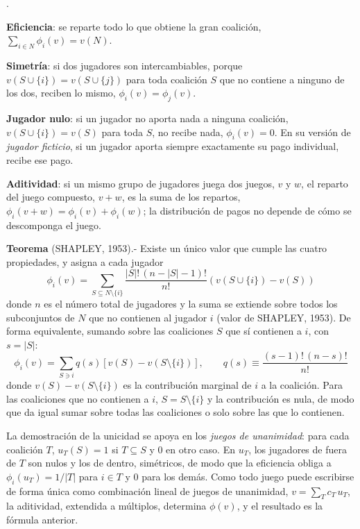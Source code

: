 \documentclass[10pt,a4paper]{article}
\newcounter{numitem}
\newenvironment{lnum}
      {\begin{list}{\arabic{numitem}.}{%
          \usecounter{numitem}%
          \setlength{\leftmargin}{1cm}%
          \setlength{\parskip}{3pt}%
          \setlength{\itemsep}{0pt}%
          \setlength{\parsep}{0pt}%
      }}
      {\end{list}}
\begin{document}
\begin{lnum}
    \item \textbf{Eficiencia}: se reparte todo lo que obtiene la gran coalición, $\sum_{i\in N}\phi_i(v)=v(N)$.
    \item \textbf{Simetría}: si dos jugadores son intercambiables, porque $v(S\cup\{i\})=v(S\cup\{j\})$ para toda coalición $S$ que no contiene a ninguno de los dos, reciben lo mismo, $\phi_i(v)=\phi_j(v)$.
    \item \textbf{Jugador nulo}: si un jugador no aporta nada a ninguna coalición, $v(S\cup\{i\})=v(S)$ para toda $S$, no recibe nada, $\phi_i(v)=0$. En su versión de \textit{jugador ficticio}, si un jugador aporta siempre exactamente su pago individual, recibe ese pago.
    \item \textbf{Aditividad}: si un mismo grupo de jugadores juega dos juegos, $v$ y $w$, el reparto del juego compuesto, $v+w$, es la suma de los repartos, $\phi_i(v+w)=\phi_i(v)+\phi_i(w)$; la distribución de pagos no depende de cómo se descomponga el juego.
\end{lnum}

\textbf{Teorema} (SHAPLEY, 1953).- Existe un único valor que cumple las cuatro propiedades, y asigna a cada jugador
$$\phi_i(v)=\sum_{S\subseteq N\setminus\{i\}}\frac{|S|!\,(n-|S|-1)!}{n!}\left(v(S\cup\{i\})-v(S)\right)$$
donde $n$ es el número total de jugadores y la suma se extiende sobre todos los subconjuntos de $N$ que no contienen al jugador $i$ (valor de SHAPLEY, 1953). De forma equivalente, sumando sobre las coaliciones $S$ que sí contienen a $i$, con $s=|S|$:
$$\phi_i(v)=\sum_{S\ni i}q(s)\left[v(S)-v(S\setminus\{i\})\right],\qquad q(s)\equiv\frac{(s-1)!\,(n-s)!}{n!}$$
donde $v(S)-v(S\setminus\{i\})$ es la contribución marginal de $i$ a la coalición. Para las coaliciones que no contienen a $i$, $S=S\setminus\{i\}$ y la contribución es nula, de modo que da igual sumar sobre todas las coaliciones o solo sobre las que lo contienen.

La demostración de la unicidad se apoya en los \textit{juegos de unanimidad}: para cada coalición $T$, $u_T(S)=1$ si $T\subseteq S$ y $0$ en otro caso. En $u_T$, los jugadores de fuera de $T$ son nulos y los de dentro, simétricos, de modo que la eficiencia obliga a $\phi_i(u_T)=1/|T|$ para $i\in T$ y $0$ para los demás. Como todo juego puede escribirse de forma única como combinación lineal de juegos de unanimidad, $v=\sum_Tc_T\,u_T$, la aditividad, extendida a múltiplos, determina $\phi(v)$, y el resultado es la fórmula anterior.
\end{document}

